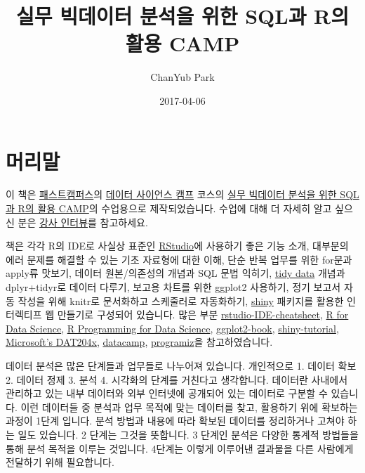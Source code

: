 \documentclass[]{book}
\title{실무 빅데이터 분석을 위한 SQL과 R의 활용 CAMP}
\author{ChanYub Park}
\date{2017-04-06}
\theoremstyle{definition}
\theoremstyle{definition}
\theoremstyle{remark}
\begin{document}
\maketitle

{
\setcounter{tocdepth}{1}
\tableofcontents
}
\chapter*{머리말}

이 책은 \href{http://www.fastcampus.co.kr}{패스트캠퍼스}의
\href{http://www.fastcampus.co.kr/category_data_camp/}{데이터 사이언스
캠프} 코스의 \href{http://www.fastcampus.co.kr/data_camp_dabrp/}{실무
빅데이터 분석을 위한 SQL과 R의 활용 CAMP}의 수업용으로 제작되었습니다.
수업에 대해 더 자세히 알고 싶으신 분은
\href{http://www.fastcampus.co.kr/data_camp_dabrp_instructor_1/}{강사
인터뷰}를 참고하세요.

책은 각각 R의 IDE로 사실상 표준인
\href{http://www.rstudio.org/}{RStudio}에 사용하기 좋은 기능 소개,
대부분의 에러 문제를 해결할 수 있는 기초 자료형에 대한 이해, 단순 반복
업무를 위한 for문과 apply류 맛보기, 데이터 원본/의존성의 개념과 SQL 문법
익히기, \href{http://vita.had.co.nz/papers/tidy-data.pdf}{tidy data}
개념과 dplyr+tidyr로 데이터 다루기, 보고용 차트를 위한 ggplot2 사용하기,
정기 보고서 자동 작성을 위해 knitr로 문서화하고 스케줄러로 자동화하기,
\href{https://shiny.rstudio.com/}{shiny} 패키지를 활용한 인터렉티프 웹
만들기로 구성되어 있습니다. 많은 부분
\href{https://www.rstudio.com/wp-content/uploads/2016/01/rstudio-IDE-cheatsheet.pdf}{rstudio-IDE-cheatsheet},
\href{http://r4ds.had.co.nz/}{R for Data Science},
\href{https://bookdown.org/rdpeng/rprogdatascience/}{R Programming for
Data Science}, \href{http://had.co.nz/ggplot2/}{ggplot2-book},
\href{https://shiny.rstudio.com/tutorial/}{shiny-tutorial},
\href{https://courses.edx.org/courses/course-v1:Microsoft+DAT204x+1T2017/info}{Microsoft's
DAT204x},
\href{https://www.datacamp.com/community/tutorials/}{datacamp},
\href{https://www.programiz.com/r-programming/}{programiz}을
참고하였습니다.

데이터 분석은 많은 단계들과 업무들로 나누어져 있습니다. 개인적으로 1.
데이터 확보 2. 데이터 정제 3. 분석 4. 시각화의 단계를 거친다고
생각합니다. 데이터란 사내에서 관리하고 있는 내부 데이터와 외부 인터넷에
공개되어 있는 데이터로 구분할 수 있습니다. 이런 데이터들 중 분석과 업무
목적에 맞는 데이터를 찾고, 활용하기 위에 확보하는 과정이 1단계 입니다.
분석 방법과 내용에 따라 확보된 데이터를 정리하거나 고쳐야 하는 일도
있습니다. 2 단계는 그것을 뜻합니다. 3 단계인 분석은 다양한 통계적
방법들을 통해 분석 목적을 이루는 것입니다. 4단계는 이렇게 이루어낸
결과물을 다른 사람에게 전달하기 위해 필요합니다.
\end{document}
